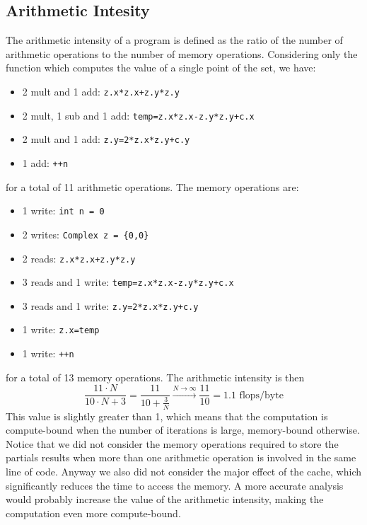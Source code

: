 \subsection{Arithmetic Intesity}
    The arithmetic intensity of a program is defined as the ratio of the
    number of arithmetic operations to the number of memory operations.
    Considering only the function which computes the value of a single
    point of the set, we have:
    \begin{itemize}
        \item 2 mult and 1 add: \texttt{z.x*z.x+z.y*z.y}
        \item 2 mult, 1 sub and 1 add: \texttt{temp=z.x*z.x-z.y*z.y+c.x}
        \item 2 mult and 1 add: \texttt{z.y=2*z.x*z.y+c.y}
        \item 1 add: \texttt{++n}
    \end{itemize}
    for a total of 11 arithmetic operations. The memory operations are:
    \begin{itemize}
        \item 1 write: \texttt{int n = 0} 
        \item 2 writes: \texttt{Complex z = \{0,0\}}
        \item 2 reads: \texttt{z.x*z.x+z.y*z.y}
        \item 3 reads and 1 write: \texttt{temp=z.x*z.x-z.y*z.y+c.x}
        \item 3 reads and 1 write: \texttt{z.y=2*z.x*z.y+c.y}
        \item 1 write: \texttt{z.x=temp}
        \item 1 write: \texttt{++n}
    \end{itemize}
    for a total of 13 memory operations. The arithmetic intensity is then
    $$
        \frac{11 \cdot N}{ 10\cdot N + 3} 
        = \frac{11}{10+\frac{3}{N}} \xrightarrow{N \to \infty} \frac{11}{10}
        = 1.1 \text{ flops/byte}
    $$
    This value is slightly greater than 1, which means that the computation
    is compute-bound when the number of iterations is large, memory-bound
    otherwise. Notice that we did not consider the memory operations
    required to store the partials results when more than one arithmetic
    operation is involved in the same line of code.
    Anyway we also did not consider the major effect
    of the cache, which significantly reduces the time to access the memory.
    A more accurate analysis would probably increase the value of the
    arithmetic intensity, making the computation even more compute-bound.


